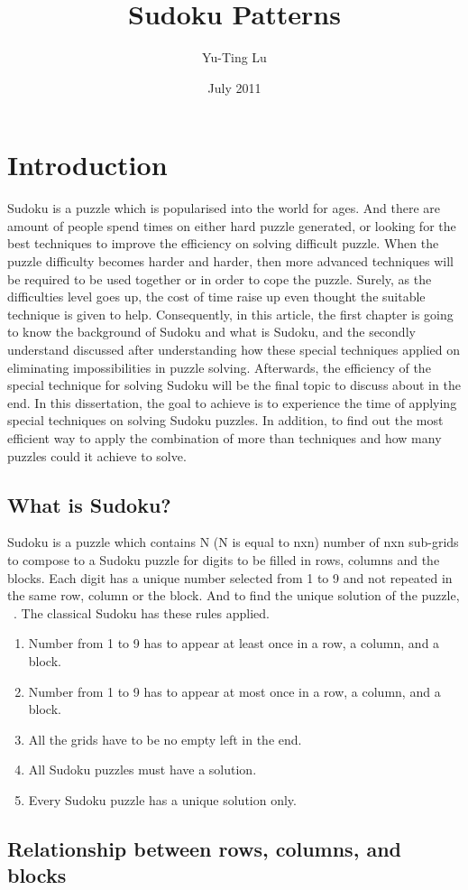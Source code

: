 \documentclass[11pt]{report}
\begin{document}
\title{Sudoku Patterns}
\author{Yu-Ting Lu}
\date{July 2011}
\maketitle

\tableofcontents

\chapter{Introduction}
\label{cha:Introduction}


Sudoku is a puzzle which is popularised into the world for ages. And there are amount of people spend times on either hard puzzle generated, or looking for the best techniques to improve the efficiency on solving difficult puzzle.
When the puzzle difficulty becomes harder and harder, then more advanced techniques will be required to be used together or in order to cope the puzzle. Surely, as the difficulties level goes up, the cost of time raise up even thought the suitable technique is given to help. Consequently, in this article, the first chapter is going to know the background of Sudoku and what is Sudoku, and the secondly understand discussed after understanding how these special techniques applied on eliminating impossibilities in puzzle solving. Afterwards, the efficiency of the special technique for solving Sudoku will be the final topic to discuss about in the end.
In this dissertation, the goal to achieve is to experience the time of applying special techniques on solving Sudoku puzzles. In addition, to find out the most efficient way to apply the combination of more than techniques and how many puzzles could it achieve to solve.


\section{What is Sudoku?}
\label{sec:whatissudoku}

Sudoku is a puzzle which contains N (N is equal to nxn) number of nxn sub-grids to compose to a Sudoku puzzle for digits to be filled in rows, columns and the blocks. Each digit has a unique number selected from 1 to 9 and not repeated in the same row, column or the block.
And to find the unique solution of the puzzle,  ~\cite{Berthier2007Sudoku}.
The classical Sudoku has these rules applied.
\begin{enumerate}
\item Number from 1 to 9 has to appear at least once in a row, a column, and a block.
\item Number from 1 to 9 has to appear at most once in a row, a column, and a block.
\item All the grids have to be no empty left in the end.
\item All Sudoku puzzles must have a solution.
\item Every Sudoku puzzle has a unique solution only.
\end{enumerate}


\section{Relationship between rows, columns, and blocks}
\label{sec:Relationship}








\end{document}
